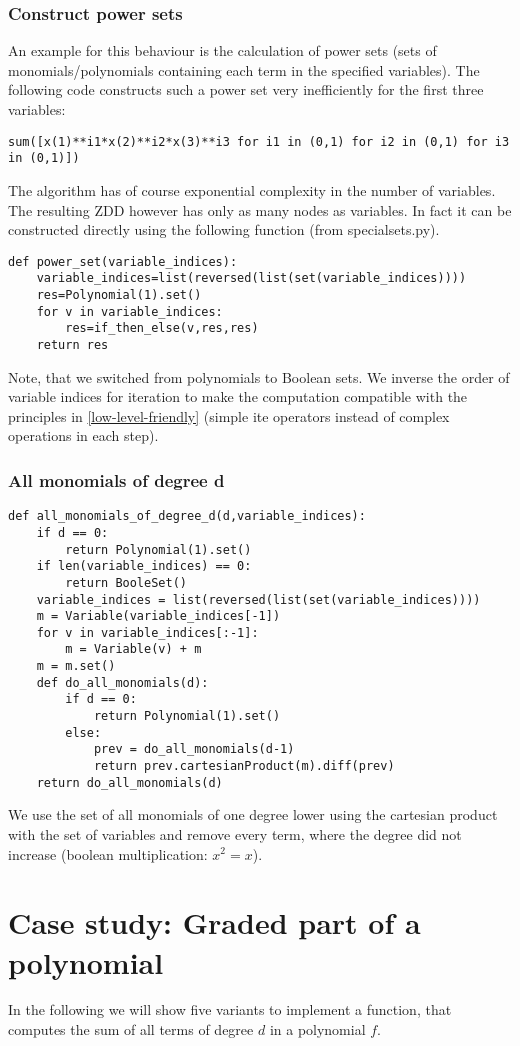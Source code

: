 \documentclass[]{article}
\newcommand{\ite}{{ite}\xspace}
\newcounter{thm}
\begin{document}
\subsubsection{Construct power sets}
An example for this behaviour is the calculation of power sets (sets of monomials/polynomials containing each term in the specified variables).
The following code constructs such a power set very inefficiently for the first three variables:
\begin{verbatim}
sum([x(1)**i1*x(2)**i2*x(3)**i3 for i1 in (0,1) for i2 in (0,1) for i3 in (0,1)])
\end{verbatim}
The algorithm has of course exponential complexity in the number of variables.
The resulting ZDD however has only as many nodes as variables.
In fact it can be constructed directly using the following function (from specialsets.py).
\begin{verbatim}
def power_set(variable_indices):
    variable_indices=list(reversed(list(set(variable_indices))))
    res=Polynomial(1).set()
    for v in variable_indices:
        res=if_then_else(v,res,res)
    return res
\end{verbatim}
Note, that we switched from polynomials to Boolean sets. We inverse the order of variable indices for iteration to make the computation compatible with the principles in \ref{low-level-friendly} (simple \ite operators instead of complex operations in each step).
\subsubsection{All monomials of degree d}
\begin{verbatim}
def all_monomials_of_degree_d(d,variable_indices):
    if d == 0:
        return Polynomial(1).set()
    if len(variable_indices) == 0:
        return BooleSet()
    variable_indices = list(reversed(list(set(variable_indices))))
    m = Variable(variable_indices[-1])
    for v in variable_indices[:-1]:
        m = Variable(v) + m
    m = m.set()
    def do_all_monomials(d):
        if d == 0:
            return Polynomial(1).set()
        else:
            prev = do_all_monomials(d-1)
            return prev.cartesianProduct(m).diff(prev)
    return do_all_monomials(d)
\end{verbatim}
We use the set of all monomials of one degree lower using the cartesian product with the set of variables and remove every term, where the degree did not increase (boolean multiplication: $x^2=x$).

\section{Case study: Graded part of a polynomial}
In the following we will show five variants to implement a function, that computes the sum of all terms of degree $d$ in a polynomial $f$.
\end{document}
